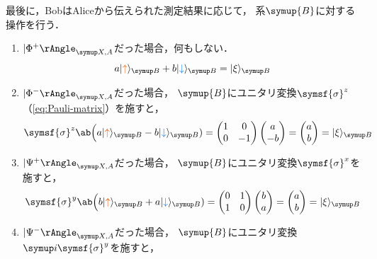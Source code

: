 \documentclass[
]{sotsu}
\newcommand{\bitone}{\mathcolor{fire}{\uparrow}}
\newcommand{\bittwo}{\mathcolor{water}{\downarrow}}
\begin{document}
最後に，BobはAliceから伝えられた測定結果に応じて，
系$\symup{B}$に対する操作を行う．
\begin{enumerate}
    \item $\Ket{\Phi^+}<X,A>$だった場合，何もしない．
        \begin{equation*}
            a \ket{\bitone}<B> + b \ket{\bittwo}<B>
            = \ket{\xi}<B>
        \end{equation*}
    \item $\Ket{\Phi^-}<X,A>$だった場合，
        $\symup{B}$にユニタリ変換$\symsf{\sigma}^z$（\cref{eq:Pauli-matrix}）を施すと，
        \begin{equation*}
            \symsf{\sigma}^z \ab\Big( a \ket{\bitone}<B> - b \ket{\bittwo}<B> )
            = \begin{pmatrix}
                1  &   0  \\
                0  &  -1
            \end{pmatrix}
            \begin{pmatrix}
                a  \\  -b
            \end{pmatrix}
            = \begin{pmatrix}
                a  \\  b
            \end{pmatrix}
            = \ket{\xi}<B>
        \end{equation*}
    \item $\Ket{\Psi^+}<X,A>$だった場合，
        $\symup{B}$にユニタリ変換$\symsf{\sigma}^x$を施すと，
        \begin{equation*}
            \symsf{\sigma}^y \ab\Big( b \ket{\bitone}<B> + a \ket{\bittwo}<B> )
            = \begin{pmatrix}
                0  &  1  \\
                1  &  0
            \end{pmatrix}
            \begin{pmatrix}
                b  \\  a
            \end{pmatrix}
            = \begin{pmatrix}
                a  \\  b
            \end{pmatrix}
            = \ket{\xi}<B>
        \end{equation*}
    \item $\Ket{\Psi^-}<X,A>$だった場合，
        $\symup{B}$にユニタリ変換$\iu \symsf{\sigma}^y$を施すと，

\end{enumerate}
\end{document}

